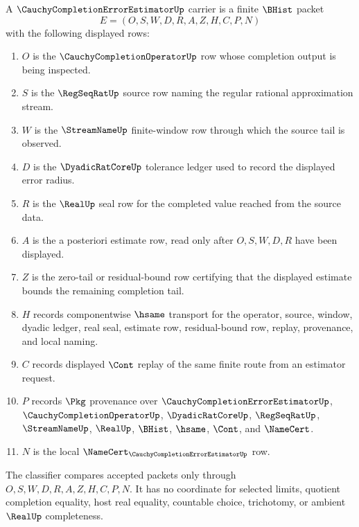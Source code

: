 \begin{definition}
\label{def:cauchy-completion-error-estimator-carrier}
A $\CauchyCompletionErrorEstimatorUp$ carrier is a finite $\BHist$ packet
$$
E=(O,S,W,D,R,A,Z,H,C,P,N)
$$
with the following displayed rows:
\begin{enumerate}
\item $O$ is the $\CauchyCompletionOperatorUp$ row whose completion output is being inspected.
\item $S$ is the $\RegSeqRatUp$ source row naming the regular rational approximation stream.
\item $W$ is the $\StreamNameUp$ finite-window row through which the source tail is observed.
\item $D$ is the $\DyadicRatCoreUp$ tolerance ledger used to record the displayed error radius.
\item $R$ is the $\RealUp$ seal row for the completed value reached from the source data.
\item $A$ is the a posteriori estimate row, read only after $O,S,W,D,R$ have been displayed.
\item $Z$ is the zero-tail or residual-bound row certifying that the displayed estimate bounds the remaining completion tail.
\item $H$ records componentwise $\hsame$ transport for the operator, source, window, dyadic ledger, real seal, estimate row, residual-bound row, replay, provenance, and local naming.
\item $C$ records displayed $\Cont$ replay of the same finite route from an estimator request.
\item $P$ records $\Pkg$ provenance over $\CauchyCompletionErrorEstimatorUp$, $\CauchyCompletionOperatorUp$, $\DyadicRatCoreUp$, $\RegSeqRatUp$, $\StreamNameUp$, $\RealUp$, $\BHist$, $\hsame$, $\Cont$, and $\NameCert$.
\item $N$ is the local $\NameCert_{\CauchyCompletionErrorEstimatorUp}$ row.
\end{enumerate}
The classifier compares accepted packets only through $O,S,W,D,R,A,Z,H,C,P,N$. It has no coordinate for selected limits, quotient completion equality, host real equality, countable choice, trichotomy, or ambient $\RealUp$ completeness.
\end{definition}

